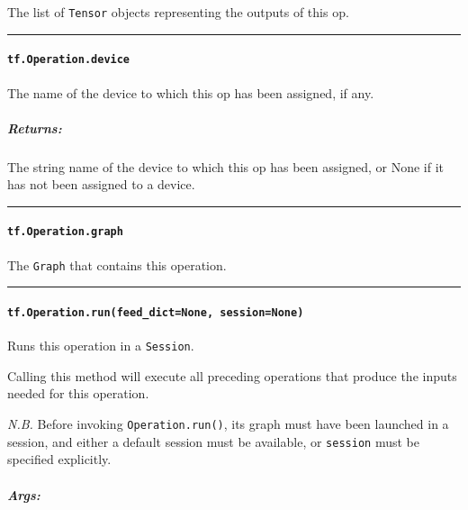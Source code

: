 The list of \lstinline{Tensor} objects representing the outputs of this op.

\begin{center}\rule{0.5\linewidth}{\linethickness}\end{center}

\paragraph{\texorpdfstring{\lstinline{tf.Operation.device}
}{tf.Operation.device }}\label{tf.operation.device}

The name of the device to which this op has been assigned, if any.

\subparagraph{Returns: }\label{returns-15}

The string name of the device to which this op has been assigned, or
None if it has not been assigned to a device.

\begin{center}\rule{0.5\linewidth}{\linethickness}\end{center}

\paragraph{\texorpdfstring{\lstinline{tf.Operation.graph}
}{tf.Operation.graph }}\label{tf.operation.graph}

The \lstinline{Graph} that contains this operation.

\begin{center}\rule{0.5\linewidth}{\linethickness}\end{center}

\paragraph{\texorpdfstring{\lstinline{tf.Operation.run(feed_dict=None, session=None)}
}{tf.Operation.run(feed_dict=None, session=None) }}\label{tf.operation.run}

Runs this operation in a \lstinline{Session}.

Calling this method will execute all preceding operations that produce
the inputs needed for this operation.

\emph{N.B.} Before invoking \lstinline{Operation.run()}, its graph must
have been launched in a session, and either a default session must be
available, or \lstinline{session} must be specified explicitly.

\subparagraph{Args: }\label{args-12}

